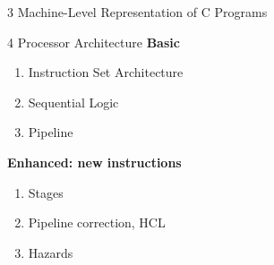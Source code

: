 \documentclass{beamer}
\begin{document}
\begin{frame}{3 Machine-Level Representation of C Programs}
	\only<1> {
}
 {
}
\end{frame}

\begin{frame}{4 Processor Architecture}
\textbf{Basic}
\begin{enumerate}
	\item Instruction Set Architecture
	\item Sequential Logic
	\item Pipeline
\end{enumerate}
\textbf{Enhanced: new instructions}
\begin{enumerate}
	\item Stages
	\item Pipeline correction, HCL
	\item Hazards
\end{enumerate}
\end{frame}
\end{document}

